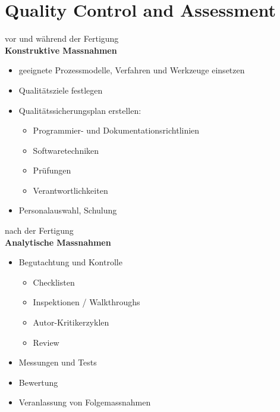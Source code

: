 \section{Quality Control and Assessment}
\ifslides
\else
%
\begin{minipage}[t]{7cm}
\fi
\sloppy
vor und w\"ahrend der Fertigung\\[2ex]
{\bfseries Konstruktive Massnahmen}
\begin{itemize}
\item geeignete Prozessmodelle, Verfahren und Werkzeuge einsetzen
\item Qualit\"atsziele festlegen
\item Qualit\"atssicherungsplan erstellen:
        \begin{itemize}
        \item Programmier- und Dokumentationsrichtlinien
        \item Softwaretechniken
        \item Pr\"ufungen
        \item Verantwortlichkeiten
        \end{itemize}
\item Personalauswahl, Schulung
\end{itemize}
\ifslides
\newpage
\else
\end{minipage}
\hfill
\begin{minipage}[t]{7cm}
\sloppy
\fi
 nach der Fertigung \\[2ex]
{\bfseries Analytische Massnahmen}
                        \begin{itemize}
                        \item Begutachtung und Kontrolle
                                \begin{itemize}
                                \item Checklisten
                                \item Inspektionen / Walkthroughs
                                \item Autor-Kritikerzyklen
                                \item Review
                                \end{itemize}
                        \item Messungen und Tests
                        \item Bewertung
                        \item Veranlassung von Folgemassnahmen
                        \end{itemize}
\ifslides
\else
\end{minipage}
\fi

